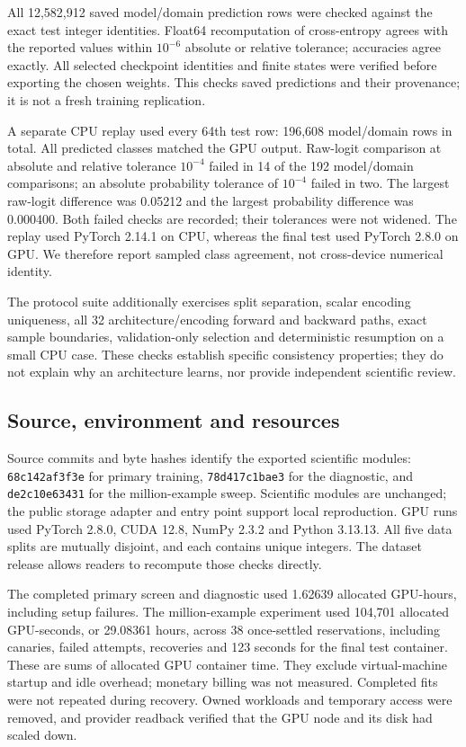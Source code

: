 \documentclass{article}
\begin{document}
All 12,582,912 saved model/domain prediction rows were checked against the exact
test integer identities. Float64 recomputation of cross-entropy agrees with the
reported values within $10^{-6}$ absolute or relative tolerance; accuracies agree
exactly. All selected checkpoint identities and finite states were verified before
exporting the chosen weights. This checks saved predictions and their provenance;
it is not a fresh training replication.

A separate CPU replay used every 64th test row: 196,608 model/domain rows in total.
All predicted classes matched the GPU output. Raw-logit comparison at absolute
and relative tolerance $10^{-4}$ failed in 14 of the 192 model/domain comparisons;
an absolute probability tolerance of $10^{-4}$ failed in two. The largest raw-logit
difference was 0.05212 and the largest probability difference was 0.000400.
Both failed checks are recorded; their tolerances were not widened. The replay
used PyTorch 2.14.1 on CPU, whereas the final test used PyTorch 2.8.0 on GPU.
We therefore report sampled class agreement, not cross-device numerical identity.

The protocol suite additionally exercises split separation, scalar encoding
uniqueness, all 32 architecture/encoding forward and backward paths, exact sample
boundaries, validation-only selection and deterministic resumption on a small CPU
case. These checks establish specific consistency properties; they do not explain
why an architecture learns, nor provide independent scientific review.

\newpage
\subsection{Source, environment and resources}
Source commits and byte hashes identify the exported scientific modules:
\texttt{68c142af3f3e} for primary training, \texttt{78d417c1bae3} for the diagnostic,
and \texttt{de2c10e63431} for the million-example sweep. Scientific modules are
unchanged; the public storage adapter and entry point support local reproduction.
GPU runs used PyTorch 2.8.0, CUDA 12.8, NumPy 2.3.2 and Python 3.13.13.
All five data splits are mutually disjoint, and each contains unique integers.
The dataset release allows readers to recompute those checks directly.

The completed primary screen and diagnostic used 1.62639 allocated GPU-hours,
including setup failures. The million-example experiment used 104,701 allocated
GPU-seconds, or 29.08361 hours, across 38 once-settled reservations, including
canaries, failed attempts, recoveries and 123 seconds for the final test container.
These are sums of allocated GPU container time. They exclude virtual-machine
startup and idle overhead; monetary billing was not measured. Completed fits were
not repeated during recovery. Owned workloads and temporary access were removed,
and provider readback verified that the GPU node and its disk had scaled down.
\end{document}
